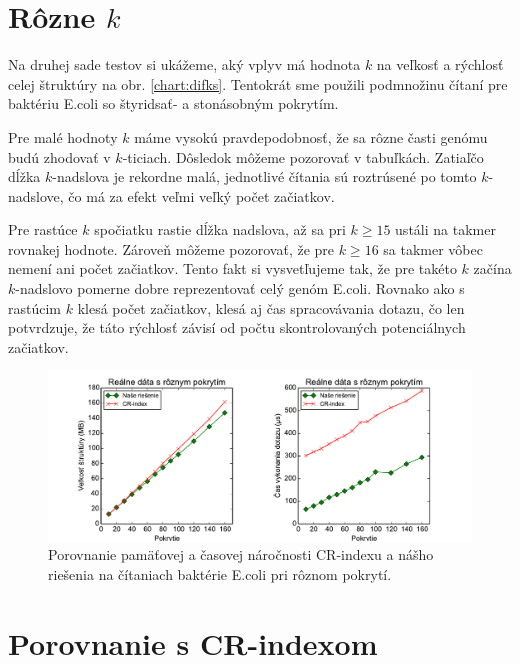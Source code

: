 \section{Rôzne $k$}

Na druhej sade testov si ukážeme, aký vplyv má hodnota $k$ na veľkosť a rýchlosť celej štruktúry na obr. \ref{chart:difks}.
Tentokrát sme použili podmnožinu čítaní pre baktériu E.coli so štyridsať- a stonásobným pokrytím.

Pre malé hodnoty $k$ máme vysokú pravdepodobnosť, že sa rôzne časti genómu budú zhodovať v $k$-ticiach.
Dôsledok môžeme pozorovať v tabuľkách. Zatiaľčo dĺžka $k$-nadslova je rekordne malá, jednotlivé
čítania sú roztrúsené po tomto $k$-nadslove, čo má za efekt veľmi veľký počet začiatkov.

Pre rastúce
$k$ spočiatku rastie dĺžka nadslova, až sa pri $k \ge 15$ ustáli na takmer rovnakej hodnote. Zároveň
môžeme pozorovať, že pre $k \ge 16$ sa takmer vôbec nemení ani počet začiatkov. Tento fakt si
vysvetľujeme tak, že pre takéto $k$ začína $k$-nadslovo pomerne dobre reprezentovať celý genóm
E.coli. Rovnako ako s rastúcim $k$ klesá počet začiatkov, klesá aj čas spracovávania dotazu, čo len
potvrdzuje, že táto rýchlosť závisí od počtu skontrolovaných potenciálnych začiatkov.

\begin{figure}

\centerline{\includegraphics[width=1\textwidth]{images/chart_srcr.pdf}}

\caption[Porovnanie CR-indexu a našej štruktúry]{Porovnanie pamäťovej a časovej náročnosti
CR-indexu a nášho riešenia na čítaniach baktérie E.coli pri rôznom pokrytí.}

\label{chart:srcr}

\end{figure}

\section{Porovnanie s CR-indexom}

